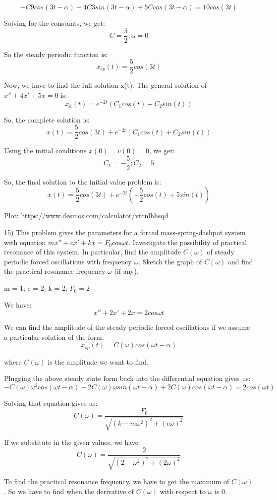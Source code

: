 \documentclass{article}
\begin{document}
\[-C 9 cos(3t - \alpha) - 4 C 3 sin(3t - \alpha) + 5 C cos(3t - \alpha) = 10 cos(3t)\]

Solving for the constants, we get:
\[C = \frac{5}{2}; \alpha = 0\]

So the steady periodic function is:
\[x_{sp}(t) = \frac{5}{2} cos(3t)\]

Now, we have to find the full solution x(t). The general solution of
$x'' + 4x' + 5x = 0$ is:
\[x_h(t) = e^{-2t} (C_1 cos(t) + C_2 sin(t))\]

So, the complete solution is:
\[x(t) = \frac{5}{2} cos(3t) + e^{-2t} (C_1 cos(t) + C_2 sin(t))\]

Using the initial conditions $x(0) = v(0) = 0$, we get:
\[C_1 = -\frac{5}{2}; C_2 = 5\]

So, the final solution to the initial value problem is:
\[x(t) = \frac{5}{2} cos(3t) + e^{-2t} (-\frac{5}{2} cos(t) + 5 sin(t))\]


Plot: https://www.desmos.com/calculator/vtcnlhhsqd



15) This problem gives the parameters for a forced mass-spring-dashpot system with equation
$mx'' + cx' + kx = F_0 cos \omega t$. Investigate the possibility of practical
resonance of this system. In particular, find the amplitude $C(\omega)$ of
steady periodic forced oscillations with frequency $\omega$. Sketch the
graph of $C(\omega)$ and find the practical resonance frequency $\omega$ (if any).

m = 1; c = 2; k = 2; $F_0 = 2$

We have:
\[x'' + 2x' + 2x = 2 cos \omega t\]

We can find the amplitude of the steady periodic forced oscillations
if we assume a particular solution of the form:
\[x_{sp}(t) = C(\omega) cos(\omega t - \alpha)\]

where $C(\omega)$ is the amplitude we want to find.

Plugging the above steady state form back into the differential equation gives us:
\[-C(\omega) \omega^2 cos(\omega t - \alpha) - 2 C(\omega) \omega sin(\omega t - \alpha) + 2 C(\omega) cos(\omega t - \alpha) = 2 cos(\omega t)\]

Solving that equation gives us:
\[C(\omega) = \frac{F_0}{\sqrt{(k - m \omega^2)^2 + (c \omega)^2}}\]

If we substitute in the given values, we have:
\[C(\omega) = \frac{2}{\sqrt{(2 - \omega^2)^2 + (2 \omega)^2}}\]

To find the practical resonance frequency, we have to get the maximum
of $C(\omega)$. So we have to find when the derivative of $C(\omega)$
with respect to $\omega$ is 0.
\end{document}
